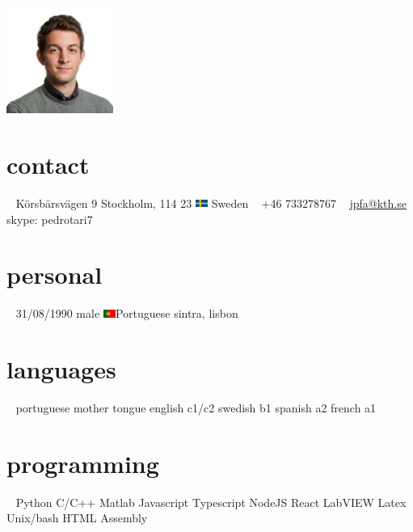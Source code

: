 \documentclass[]{friggeri-cv} %
\begin{document}


\begin{aside} %

\includegraphics[width=3.5cm,height=3.5cm]{photo}
\section{contact}
~
Körsbärsvägen 9
Stockholm, 114 23
\includegraphics[width=0.4cm,height=0.3cm]{sweden} Sweden
~
+46 733278767
~
\href{mailto:jpfa@kth.se}{jpfa@kth.se}
skype: pedrotari7
\section{personal}
~
31/08/1990
male
\includegraphics[width=0.4cm,height=0.3cm]{portugal}Portuguese
sintra, lisbon
\section{languages}
~
portuguese mother tongue
english c1/c2
swedish b1
spanish a2
french a1
\section{programming}
~
Python
C/C++
Matlab
Javascript
Typescript
NodeJS
React
LabVIEW
Latex
Unix/bash
HTML
Assembly
\end{aside}


\end{document}
